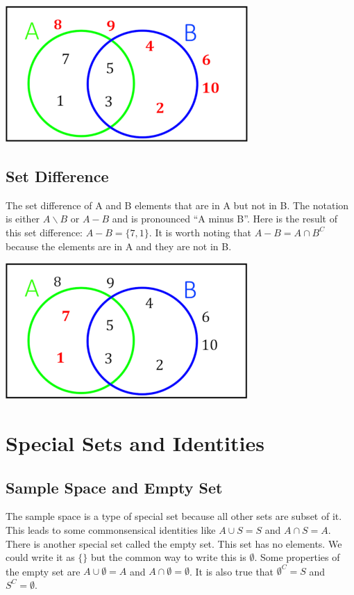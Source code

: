 \documentclass[
]{book}
\theoremstyle{definition}
\theoremstyle{definition}
\theoremstyle{definition}
\theoremstyle{remark}
\begin{document}
\includegraphics{Pictures/01-Sets/AC.PNG}

\hypertarget{set-difference}{%
\subsection{Set Difference}\label{set-difference}}

The set difference of A and B elements that are in A but not in B. The notation is either \(A \backslash B\) or \(A - B\) and is pronounced ``A minus B''. Here is the result of this set difference: \(A - B = \{7,1\}\). It is worth noting that \(A-B=A \cap B^C\) because the elements are in A and they are not in B.

\includegraphics{Pictures/01-Sets/A-B.PNG}

\hypertarget{special-sets-and-identities}{%
\section{Special Sets and Identities}\label{special-sets-and-identities}}

\hypertarget{sample-space-and-empty-set}{%
\subsection{Sample Space and Empty Set}\label{sample-space-and-empty-set}}

The sample space is a type of special set because all other sets are subset of it. This leads to some commonsensical identities like \(A \cup S = S\) and \(A \cap S = A\). There is another special set called the empty set. This set has no elements. We could write it as \(\{\}\) but the common way to write this is \(\emptyset\). Some properties of the empty set are \(A \cup \emptyset = A\) and \(A \cap \emptyset = \emptyset\). It is also true that \(\emptyset^C = S\) and \(S^C = \emptyset\).
\end{document}

